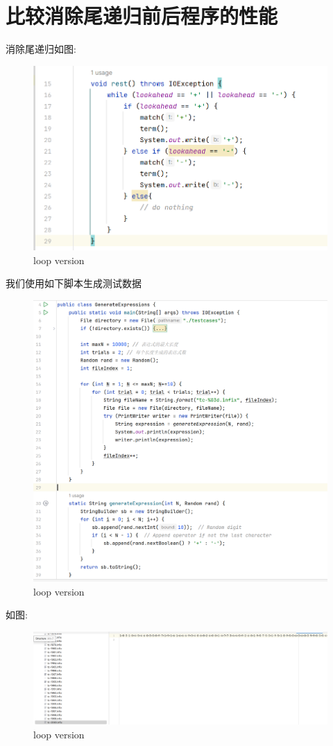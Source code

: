 \documentclass{article}
\begin{document}
\section{比较消除尾递归前后程序的性能}
消除尾递归如图:
\begin{figure}[H]
    \includegraphics[width=\textwidth]{element/4.png}
    \caption{loop version}
\end{figure}
我们使用如下脚本生成测试数据
\begin{figure}[H]
    \includegraphics[width=\textwidth]{element/6.png}
    \caption{loop version}
\end{figure}
如图:
\begin{figure}[H]
    \includegraphics[width=\textwidth]{element/7.png}
    \caption{loop version}
\end{figure}
\end{document}
